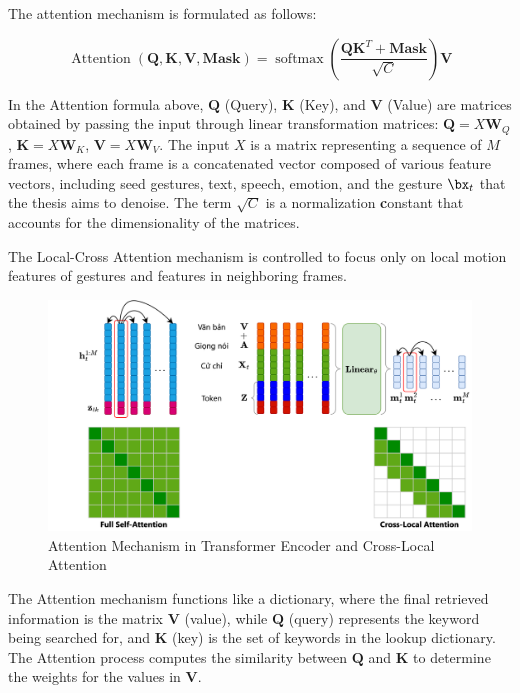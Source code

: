 The attention mechanism is formulated as follows:

\begin{equation} \label{eq:attention}
	\operatorname{Attention}(\mathbf{Q}, \mathbf{K}, \mathbf{V}, \mathbf{Mask})=\operatorname{softmax}\left(\frac{\mathbf{Q} \mathbf{K}^{T}+\mathbf{Mask}}{\sqrt{C}}\right) \mathbf{V}
\end{equation}

In the Attention formula above, $\mathbf{Q}$ (Query), $\mathbf{K}$ (Key), and $\mathbf{V}$ (Value) are matrices obtained by passing the input through linear transformation matrices: $\mathbf{Q} = {X} \mathbf{W}_Q$, $\mathbf{K} = {X} \mathbf{W}_K$, $\mathbf{V} = {X} \mathbf{W}_V$. The input $X$ is a matrix representing a sequence of $M$ frames, where each frame is a concatenated vector composed of various feature vectors, including seed gestures, text, speech, emotion, and the gesture $\bx_t$ that the thesis aims to denoise. The term $\sqrt{C}$ is a normalization \textbf{c}onstant that accounts for the dimensionality of the matrices. 

The Local-Cross Attention mechanism is controlled to focus only on local motion features of gestures and features in neighboring frames.

\begin{figure}[H][width=\textwidth]
	\centering
	\includegraphics[width=1\textwidth]{images/CrossLocalAttention}
	\caption{Attention Mechanism in Transformer Encoder and Cross-Local Attention}
	\label{fig:CrossLocalAttention}
\end{figure}

The Attention mechanism functions like a dictionary, where the final retrieved information is the matrix $\mathbf{V}$ (value), while $\mathbf{Q}$ (query) represents the keyword being searched for, and $\mathbf{K}$ (key) is the set of keywords in the lookup dictionary. The Attention process computes the similarity between \( \mathbf{Q} \) and \( \mathbf{K} \) to determine the weights for the values in \( \mathbf{V} \).

